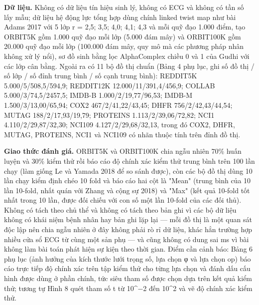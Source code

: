 \documentclass[12pt,a4paper]{article}
\begin{document}
\noindent \textbf{Dữ liệu.} Không có dữ liệu tín hiệu sinh lý, không có ECG và không có tần số lấy mẫu; dữ liệu hệ động lực tổng hợp dùng chính linked twist map như bài Adams 2017 với 5 lớp r = 2,5; 3,5; 4,0; 4,1; 4,3 và mỗi quỹ đạo 1.000 điểm, tạo ORBIT5K gồm 1.000 quỹ đạo mỗi lớp (5.000 đám mây) và ORBIT100K gồm 20.000 quỹ đạo mỗi lớp (100.000 đám mây, quy mô mà các phương pháp nhân không xử lý nổi), sơ đồ sinh bằng lọc AlphaComplex chiều 0 và 1 của Gudhi với các lớp cân bằng. Ngoài ra có 11 bộ đồ thị chuẩn (Bảng 4 phụ lục, ghi số đồ thị / số lớp / số đỉnh trung bình / số cạnh trung bình): REDDIT5K 5.000/5/508,5/594,9; REDDIT12K 12.000/11/391,4/456,9; COLLAB 5.000/3/74,5/2457,5; IMDB-B 1.000/2/19,77/96,53; IMDB-M 1.500/3/13,00/65,94; COX2 467/2/41,22/43,45; DHFR 756/2/42,43/44,54; MUTAG 188/2/17,93/19,79; PROTEINS 1.113/2/39,06/72,82; NCI1 4.110/2/29,87/32,30; NCI109 4.127/2/29,68/32,13, trong đó COX2, DHFR, MUTAG, PROTEINS, NCI1 và NCI109 có nhãn thuộc tính trên đỉnh đồ thị.\par\vspace{3pt}
\noindent \textbf{Giao thức đánh giá.} ORBIT5K và ORBIT100K chia ngẫu nhiên 70\% huấn luyện và 30\% kiểm thử rồi báo cáo độ chính xác kiểm thử trung bình trên 100 lần chạy (làm giống Le và Yamada 2018 để so sánh được), còn các bộ đồ thị dùng 10 lần chạy kiểm định chéo 10 fold và báo cáo hai cột là "Mean" (trung bình của 10 lần 10-fold, nhất quán với Zhang và cộng sự 2018) và "Max" (kết quả 10-fold tốt nhất trong 10 lần, được đối chiếu với con số một lần 10-fold của các đối thủ). Không có tách theo chủ thể và không có tách theo bản ghi vì các bộ dữ liệu không có khái niệm bệnh nhân hay bản ghi lặp lại — mỗi đồ thị là một quan sát độc lập nên chia ngẫu nhiên ở đây không phải rò rỉ dữ liệu, khác hẳn trường hợp nhiều cửa sổ ECG từ cùng một sản phụ — và cũng không có dung sai ms vì bài không làm bài toán phát hiện sự kiện theo thời gian. Điểm cần cảnh báo: Bảng 6 phụ lục (ảnh hưởng của kích thước lưới trọng số, lựa chọn φ và lựa chọn op) báo cáo trực tiếp độ chính xác trên tập kiểm thử cho từng lựa chọn và đánh dấu cấu hình được dùng ở phần chính, tức siêu tham số được chọn dựa trên kết quả kiểm thử; tương tự Hình 8 quét tham số t từ 10\textasciicircum{}−2 đến 10\textasciicircum{}2 và vẽ độ chính xác kiểm thử.\par\vspace{3pt}
\end{document}
